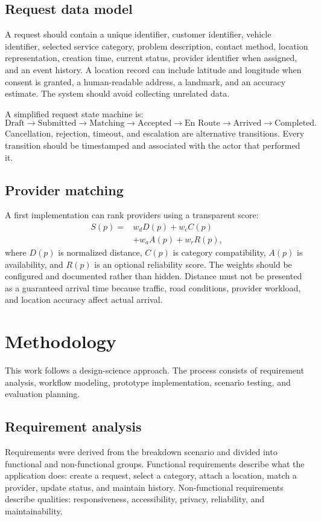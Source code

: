 \documentclass[conference]{IEEEtran}
\begin{document}
\subsection{Request data model}
A request should contain a unique identifier, customer identifier, vehicle identifier, selected service category, problem description, contact method, location representation, creation time, current status, provider identifier when assigned, and an event history. A location record can include latitude and longitude when consent is granted, a human-readable address, a landmark, and an accuracy estimate. The system should avoid collecting unrelated data.

A simplified request state machine is:
\[
\text{Draft} \rightarrow \text{Submitted} \rightarrow \text{Matching} \rightarrow \text{Accepted} \rightarrow \text{En Route} \rightarrow \text{Arrived} \rightarrow \text{Completed}.
\]
Cancellation, rejection, timeout, and escalation are alternative transitions. Every transition should be timestamped and associated with the actor that performed it.

\subsection{Provider matching}
A first implementation can rank providers using a transparent score:
\[
\begin{aligned}
S(p)={}&w_dD(p)+w_cC(p)\\
       &+w_aA(p)+w_rR(p),
\end{aligned}
\]
where $D(p)$ is normalized distance, $C(p)$ is category compatibility, $A(p)$ is availability, and $R(p)$ is an optional reliability score. The weights should be configured and documented rather than hidden. Distance must not be presented as a guaranteed arrival time because traffic, road conditions, provider workload, and location accuracy affect actual arrival.

\section{Methodology}

This work follows a design-science approach. The process consists of requirement analysis, workflow modeling, prototype implementation, scenario testing, and evaluation planning.

\subsection{Requirement analysis}
Requirements were derived from the breakdown scenario and divided into functional and non-functional groups. Functional requirements describe what the application does: create a request, select a category, attach a location, match a provider, update status, and maintain history. Non-functional requirements describe qualities: responsiveness, accessibility, privacy, reliability, and maintainability.
\end{document}
